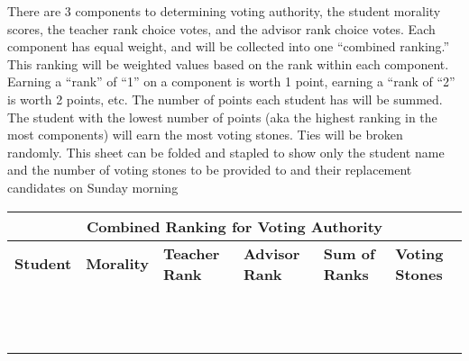 \documentclass[green]{GL2020}
\begin{document}
\name{\gVotingAuthority{}}

There are 3 components to determining voting authority, the student morality scores, the teacher rank choice votes, and the advisor rank choice votes. Each component has equal weight, and will be collected into one “combined ranking.” This ranking will be weighted values based on the rank within each component. Earning a “rank” of “1” on a component is worth 1 point, earning a “rank of “2” is worth 2 points, etc. The number of points each student has will be summed. The student with the lowest number of points (aka the highest ranking in the most components) will earn the most voting stones. Ties will be broken randomly. This sheet can be folded and stapled to show only the student name and the number of voting stones to be provided to \cPrincipal{} and their replacement candidates on Sunday morning

\begin{tabularx}{\textwidth}{| X || X | X |X || X | X |}
\hline
\multicolumn{6}{|c|}{\textbf{Combined Ranking for Voting Authority}} \\
\hline
	\textbf{Student} & \textbf{Morality}  & \textbf{Teacher Rank} & \textbf{Advisor Rank} & \textbf{Sum of Ranks} & \textbf{Voting Stones} \\
\hline
\hline
	\cLibAssist{}	&	&	&	& & \\
\hline	
	\cChupStudent{}	&	&	&	&	& \\
\hline
	\cAdopted{}	&	&	&	&	& \\
\hline
	\cDisney{}	&	&	&	&	& \\
\hline
\hline
	\cTechStar{}	&	&	&	&	& \\
\hline
	\cAmbition{}	&	&	&	&	& \\
\hline
	\cHeir{}	&	&	&	&	& \\
\hline
	\cScholarship{}	&	&	&	&	& \\
\hline
\hline
	\cPresident{}	&	&	&	&	& \\
\hline
	\cInitiate{}	&	&	&	&	& \\
\hline
	\cPirateChild{}	&	&	&	&	& \\
\hline
	\cWarlordDaughter{}	&	&	&	&	& \\
\hline
\end{tabularx}
\end{document}
